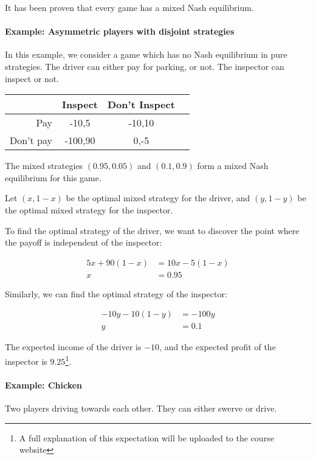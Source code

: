 \documentclass{idc_msc}
\begin{document}
It has been proven that every game has a mixed Nash equilibrium.

\paragraph{Example: Asymmetric players with disjoint strategies}

In this example, we consider a game which has no Nash equilibrium in pure strategies.
The driver can either pay for parking, or not. The inspector can inspect or not.

\begin{tabu} to \linewidth{|r|c|c|c|}
\hline
& Inspect & Don't Inspect \\
\hline
Pay & -10,5 & -10,10 \\
\hline
Don't pay & -100,90 & 0,-5 \\
\hline
\end{tabu}

The mixed strategies \((0.95, 0.05)\) and \((0.1, 0.9)\) form a mixed Nash equilibrium for this game.

Let \((x,1-x)\) be the optimal mixed strategy for the driver, and \((y, 1-y)\) be the optimal mixed strategy for the inspector.

To find the optimal strategy of the driver, we want to discover the point where the payoff is independent of the inspector:

\[
\begin{aligned}
  5x + 90(1-x) &= 10x - 5(1-x) \\
  x &= 0.95
\end{aligned}
\]

Similarly, we can find the optimal strategy of the inspector:

\[
\begin{aligned}
  -10y - 10(1-y) &= -100y \\
  y &= 0.1
\end{aligned}
\]

The expected income of the driver is \(-10\), and the expected profit of the inspector is \(9.25\)\footnote{A full explanation of this expectation will be uploaded to the course website}.

\paragraph{Example: Chicken}

Two players driving towards each other. They can either swerve or drive.
\end{document}
